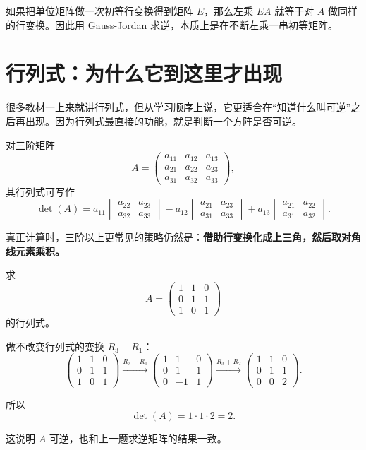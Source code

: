 \documentclass[11pt,oneside,UTF8]{ctexbook}
\newcommand{\important}[1]{\textcolor{Sakura}{\textbf{#1}}}
\begin{document}
\begin{summarybox}
如果把单位矩阵做一次初等行变换得到矩阵 \(E\)，那么左乘 \(EA\) 就等于对 \(A\) 做同样的行变换。因此用 Gauss-Jordan 求逆，本质上是在不断左乘一串初等矩阵。
\end{summarybox}

\section{行列式：为什么它到这里才出现}

很多教材一上来就讲行列式，但从学习顺序上说，它更适合在“知道什么叫可逆”之后再出现。因为行列式最直接的功能，就是判断一个方阵是否可逆。

对三阶矩阵
\[
A=
\begin{pmatrix}
a_{11}&a_{12}&a_{13}\\
a_{21}&a_{22}&a_{23}\\
a_{31}&a_{32}&a_{33}
\end{pmatrix},
\]
其行列式可写作
\[
\det(A)=
a_{11}
\begin{vmatrix}
a_{22}&a_{23}\\
a_{32}&a_{33}
\end{vmatrix}
-a_{12}
\begin{vmatrix}
a_{21}&a_{23}\\
a_{31}&a_{33}
\end{vmatrix}
+a_{13}
\begin{vmatrix}
a_{21}&a_{22}\\
a_{31}&a_{32}
\end{vmatrix}.
\]

真正计算时，三阶以上更常见的策略仍然是：\important{借助行变换化成上三角，然后取对角线元素乘积。}

\begin{examplebox}[例 5：用消元法求三阶行列式]
求
\[
A=
\begin{pmatrix}
1&1&0\\
0&1&1\\
1&0&1
\end{pmatrix}
\]
的行列式。

做不改变行列式的变换 \(R_3-R_1\)：
\[
\begin{pmatrix}
1&1&0\\
0&1&1\\
1&0&1
\end{pmatrix}
\xrightarrow{R_3-R_1}
\begin{pmatrix}
1&1&0\\
0&1&1\\
0&-1&1
\end{pmatrix}
\xrightarrow{R_3+R_2}
\begin{pmatrix}
1&1&0\\
0&1&1\\
0&0&2
\end{pmatrix}.
\]

所以
\[
\det(A)=1\cdot 1\cdot 2=2.
\]

这说明 \(A\) 可逆，也和上一题求逆矩阵的结果一致。
\end{examplebox}
\end{document}
